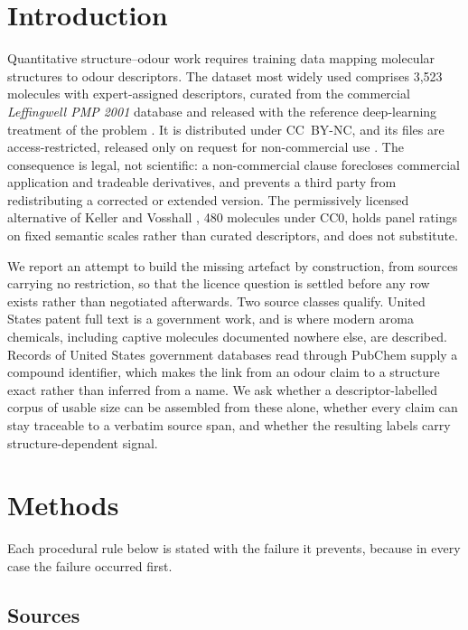 \documentclass[
  computerscience
]{genesisl1-paper}
\begin{document}
\section{Introduction}

Quantitative structure--odour work requires training data mapping molecular structures
to odour descriptors. The dataset most widely used comprises 3{,}523 molecules with
expert-assigned descriptors, curated from the commercial \emph{Leffingwell PMP 2001}
database and released with the reference deep-learning treatment of the problem
\cite{sanchez2019machine}. It is distributed under CC~BY-NC, and its files are
access-restricted, released only on request for non-commercial use \cite{leffingwell2020}.
The consequence is legal, not scientific: a non-commercial clause forecloses commercial
application and tradeable derivatives, and prevents a third party from redistributing a
corrected or extended version. The permissively licensed alternative of Keller and
Vosshall \cite{keller2016}, 480 molecules under CC0, holds panel ratings on fixed
semantic scales rather than curated descriptors, and does not substitute.

We report an attempt to build the missing artefact by construction, from sources
carrying no restriction, so that the licence question is settled before any row exists
rather than negotiated afterwards. Two source classes qualify. United States patent full
text is a government work, and is where modern aroma chemicals, including captive
molecules documented nowhere else, are described. Records of United States government
databases read through PubChem supply a compound identifier, which makes the link from
an odour claim to a structure exact rather than inferred from a name. We ask whether a
descriptor-labelled corpus of usable size can be assembled from these alone, whether
every claim can stay traceable to a verbatim source span, and whether the resulting
labels carry structure-dependent signal.

\section{Methods}

Each procedural rule below is stated with the failure it prevents, because in every
case the failure occurred first.

\subsection{Sources}
\end{document}
